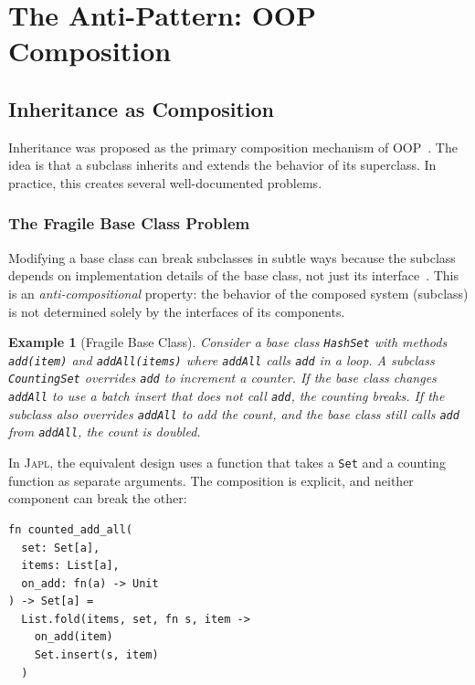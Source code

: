 \documentclass[11pt,a4paper]{article}
\newtheorem{example}[theorem]{Example}
\newcommand{\japl}{\textsc{Japl}}
\begin{document}
\section{The Anti-Pattern: OOP Composition}
\label{sec:anti-pattern}

\subsection{Inheritance as Composition}

Inheritance was proposed as the primary composition mechanism of OOP~\citep{cook1989inheritance}. The idea is that a subclass inherits and extends the behavior of its superclass. In practice, this creates several well-documented problems.

\subsubsection{The Fragile Base Class Problem}

Modifying a base class can break subclasses in subtle ways because the subclass depends on implementation details of the base class, not just its interface~\citep{mikhajlov1998study}. This is an \emph{anti-compositional} property: the behavior of the composed system (subclass) is not determined solely by the interfaces of its components.

\begin{example}[Fragile Base Class]
Consider a base class \texttt{HashSet} with methods \texttt{add(item)} and \texttt{addAll(items)} where \texttt{addAll} calls \texttt{add} in a loop. A subclass \texttt{CountingSet} overrides \texttt{add} to increment a counter. If the base class changes \texttt{addAll} to use a batch insert that does not call \texttt{add}, the counting breaks. If the subclass also overrides \texttt{addAll} to add the count, and the base class still calls \texttt{add} from \texttt{addAll}, the count is doubled.
\end{example}

In \japl{}, the equivalent design uses a function that takes a \texttt{Set} and a counting function as separate arguments. The composition is explicit, and neither component can break the other:

\begin{lstlisting}
fn counted_add_all(
  set: Set[a],
  items: List[a],
  on_add: fn(a) -> Unit
) -> Set[a] =
  List.fold(items, set, fn s, item ->
    on_add(item)
    Set.insert(s, item)
  )
\end{lstlisting}
\end{document}
